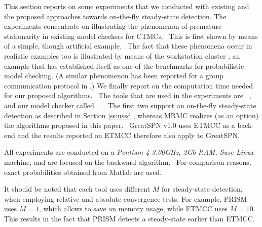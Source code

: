 \documentclass[times, 10pt,twocolumn]{article}
\begin{document}
	This section reports on some experiments that we conducted with existing and the proposed approaches towards on-the-fly steady-state detection. The experiments concentrate on illustrating the phenomenon of premature stationarity in existing model checkers for CTMCs.  This is first shown by means of a simple, though artificial example.  The fact that these phenomena occur in realistic examples too is illustrated by means of the workstation cluster \cite{HaverkortHK_SRDS00, BuchholzKKT_JLAP03, YounesKNP_TACAS04, KwiatkowskaNP_IMTTCPE02, Prism_WC05}, an example that has established itself as one of the benchmarks for probabilistic model checking. (A similar phenomenon has been reported for a group communication protocol in \cite{MassinkKL_DSN04}.) We finally report on the computation time needed for our proposed algorithms.  The tools that are used in the experiments are \prism ~\cite{KwiatkowskaNP_QEST04}, \etmcc ~\cite{HermansKMS_IJSTTT03} and our model checker called \mrmc ~\cite{KatoenKZ_QEST05}.  The first two support an on-the-fly steady-state detection as described in Section \ref{ss:ussd}, whereas MRMC realizes (as an option) the algorithms proposed in this paper.  GreatSPN v1.0 \cite{DAprileDS_DS04} uses ETMCC as a back-end and the results reported on ETMCC therefore also apply to GreatSPN.

	All experiments are conducted on a \emph{Pentium 4 3.00GHz, 2Gb RAM, Suse Linux} machine, and are focused on the backward algorithm.  For comparison reasons, exact probabilities obtained from Matlab are used.

	It should be noted that each tool uses different $M$ for steady-state detection, when employing relative and absolute convergence tests. For example, PRISM uses $M=1$, which allows to save on memory usage, while ETMCC uses $M=10$. This results in the fact that PRISM detects a steady-state earlier than ETMCC.
	
\end{document}
